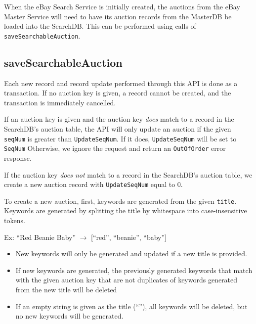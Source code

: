 \documentclass[12pt,a4paper]{article}
\begin{document}
When the eBay Search Service is initially created, the auctions from 
the eBay Master Service will need to have its auction records from the MasterDB
be loaded into the SearchDB. This can be performed using calls of \texttt{saveSearchableAuction}.

\subsection{saveSearchableAuction}

Each new record and record update performed through this API is done as a transaction. 
If no auction key is given, a record cannot be created, and the transaction is immediately cancelled.

\vspace{\baselineskip}

If an auction key is given and the auction key \emph{does} match to a record in the SearchDB's auction table,
the API will only update an auction if the given
\texttt{seqNum} is greater than \texttt{UpdateSeqNum}. If it does, \texttt{UpdateSeqNum} will be set to \texttt{SeqNum}
 Otherwise, we ignore the request
and return an \texttt{OutOfOrder} error response.

If the auction key \emph{does not} match to a record in the SearchDB's auction table,
we create a new auction record with \texttt{UpdateSeqNum} equal to 0. 

\vspace{\baselineskip}



To create a new auction, first, keywords are generated from the given \texttt{title}.
Keywords are generated by splitting the title by whitespace into case-insensitive tokens.

Ex: ``Red Beanie Baby'' $\rightarrow$ [``red'', ``beanie'', ``baby'']

\begin{itemize}
    \item New keywords will only be generated and updated if a new title is provided. 
    \item If new keywords are generated, the previously generated keywords that match with the given auction key that are not duplicates of keywords generated 
    from the new title will be deleted
    \item If an empty string is given as the title (``''), all keywords will be deleted, but no new keywords will be generated.
\end{itemize} 
\end{document}
